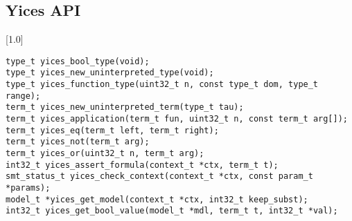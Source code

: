 \subsection{Yices API}
\begin{frame}
\scalebox{0.85}[1.0]{\begin{minipage}{40em}
\texttt{{\colEm type\_t} yices\_bool\_type({\colEm void});}
\\[0.25em]							
\texttt{{\colEm type\_t} yices\_new\_uninterpreted\_type({\colEm void});}
\\[0.25em]							
\texttt{{\colEm type\_t} yices\_function\_type({\colEm uint32\_t} n, const {\colEm type\_t} dom{\colEm []}, {\colEm type\_t} range);}
\\[0.75em]							
\texttt{{\colEm term\_t} yices\_new\_uninterpreted\_term({\colEm type\_t} tau);}
\\[0.25em]
\texttt{{\colEm term\_t} yices\_application({\colEm term\_t} fun, {\colEm uint32\_t} n, const {\colEm term\_t} arg[]);}
\\[0.25em]
\texttt{{\colEm term\_t} yices\_eq({\colEm term\_t} left, {\colEm term\_t} right);}
\\[0.75em]
\texttt{{\colEm term\_t} yices\_not({\colEm term\_t} arg);}
\\[0.25em]
\texttt{{\colEm term\_t} yices\_or({\colEm uint32\_t} n, {\colEm term\_t} arg{\colEm []});}
\\[0.75em]
\texttt{{\colEm int32\_t} yices\_assert\_formula({\colEm context\_t *ctx}, {\colEm term\_t} t);}
\\[0.75em]
\texttt{{\colEm smt\_status\_t} yices\_check\_context({\colEm context\_t *}ctx, const {\colEm param\_t *}params);}
\\[0.25em]
\texttt{{\colEm model\_t} *yices\_get\_model({\colEm context\_t *}ctx, {\colEm int32\_t} keep\_subst);}
\\[0.25em]
\texttt{{\colEm int32\_t} yices\_get\_bool\_value({\colEm model\_t *}mdl, {\colEm term\_t} t, {\colEm int32\_t *}val);}

\end{minipage}}
							
							
						
	
						\end{frame}